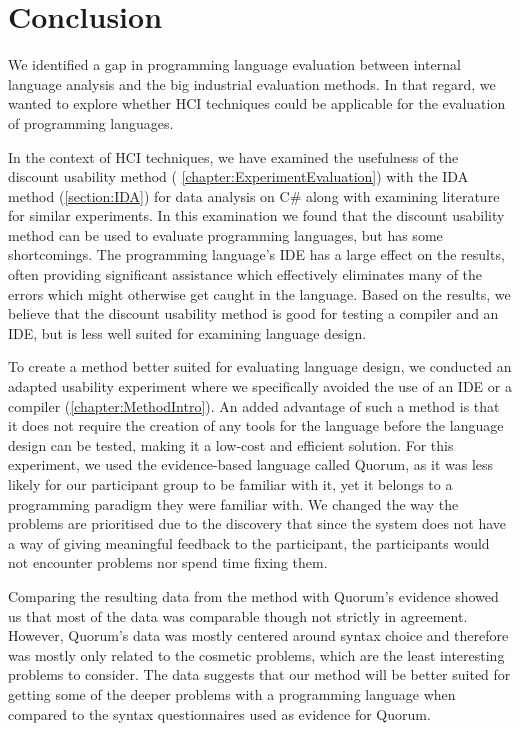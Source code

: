 \documentclass[preprint,10pt]{sigplanconf}
\begin{document}
\section{Conclusion}
We identified a gap in programming language evaluation between internal language analysis and the big industrial evaluation methods. In that regard, we wanted to explore whether HCI techniques could be applicable for the evaluation of programming languages.

In the context of HCI techniques, we have examined the usefulness of the discount usability method ( \ref{chapter:ExperimentEvaluation}) with the IDA method (\ref{section:IDA}) for data analysis on C\# along with examining literature for similar experiments.
In this examination we found that the discount usability method can be used to evaluate programming languages, but has some shortcomings.
The programming language’s IDE has a large effect on the results, often providing significant assistance which effectively eliminates many of the errors which might otherwise get caught in the language.
Based on the results, we believe that the discount usability method is good for testing a compiler and an IDE, but is less well suited for examining language design.

To create a method better suited for evaluating language design, we conducted an adapted usability experiment where we specifically avoided the use of an IDE or a compiler (\ref{chapter:MethodIntro}).
An added advantage of such a method is that it does not require the creation of any tools for the language before the language design can be tested, making it a low-cost and efficient solution.
For this experiment, we used the evidence-based language called Quorum, as it was less likely for our participant group to be familiar with it, yet it belongs to a programming paradigm they were familiar with.
We changed the way the problems are prioritised due to the discovery that since the system does not have a way of giving meaningful feedback to the participant, the participants would not encounter problems nor spend time fixing them.

Comparing the resulting data from the method with Quorum’s evidence showed us that most of the data was comparable though not strictly in agreement.
However, Quorum’s data was mostly centered around syntax choice and therefore was mostly only related to the cosmetic problems, which are the least interesting problems to consider.
The data suggests that our method will be better suited for getting some of the deeper problems with a programming language when compared to the syntax questionnaires used as evidence for Quorum.
\end{document}
